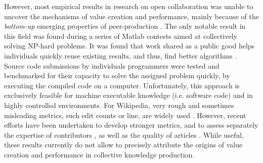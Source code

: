 However, most empirical results in research on open collaboration was unable to uncover the mechanisms of value creation and performance, mainly because of the {\it bottom-up} emerging properties of peer-production \cite{benkler2002}.  The only notable result in this field was found during a series of Matlab contests aimed at collectively solving NP-hard problems. It was found that work shared as a public good helps individuals quickly reuse existing results, and thus, find better algorithms \cite{gulley2010}. Source code submissions by individuals programmers were tested and benchmarked for their capacity to solve the assigned problem quickly, by executing the compiled code on a computer. Unfortunately, this approach is exclusively feasible for machine executable knowledge (i.e. software code) and in highly controlled environments. For Wikipedia, very rough and sometimes misleading metrics, such edit counts or line, are widely used \cite{editcountitis}.  However, recent efforts have been undertaken to develop stronger metrics, and to assess separately the expertise of contributors \cite{geiger2013}, as well as the quality of articles \cite{wang2013tell}. While useful, these results currently do not allow to precisely attribute the origins of value creation and performance in collective knowledge production.
